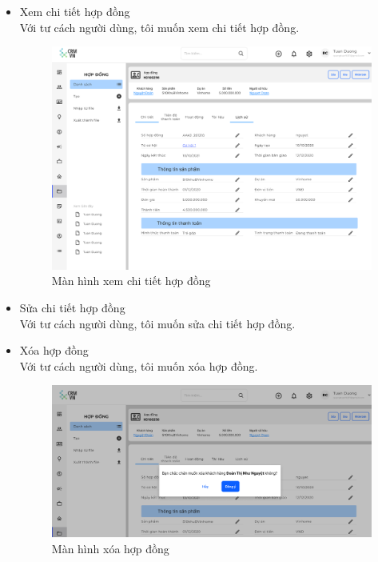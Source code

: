 \documentclass[12pt,a4paper]{article}
\begin{document}
\begin{enumerate}
\begin{itemize}
            \item Xem chi tiết hợp đồng \\
            Với tư cách người dùng, tôi muốn xem chi tiết hợp đồng.

            \begin{figure}[H]
                \centering \includegraphics[width=\textwidth]{Img/Nguyet/Hopdong/chitiet.png}
                \vspace{0.5cm}
                \caption{Màn hình xem chi tiết hợp đồng }
                \label{cthd}
            \end{figure}

            \item Sửa chi tiết hợp đồng \\
            Với tư cách người dùng, tôi muốn sửa chi tiết hợp đồng.


            \item Xóa hợp đồng \\
            Với tư cách người dùng, tôi muốn xóa hợp đồng.

            \begin{figure}[H]
                \centering \includegraphics[width=\textwidth]{Img/Nguyet/Hopdong/xoa.png}
                \vspace{0.5cm}
                \caption{Màn hình xóa hợp đồng }
                \label{xoahd}
            \end{figure}


\end{itemize}
\end{enumerate}
\end{document}
